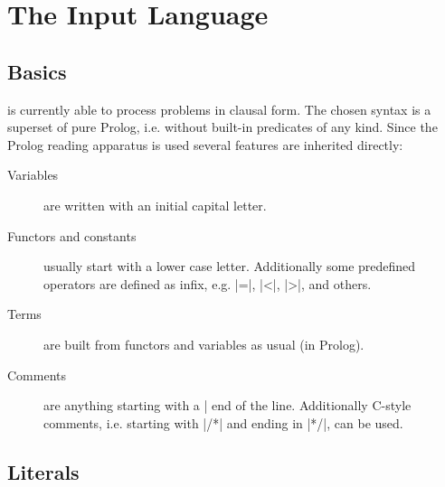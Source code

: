 
\def\SYNTAX#1.{\begin{itemize}\item[]\(#1\) \end{itemize}}

\section{The Input Language}

\subsection{Basics}

\ProCom{} is  currently able to process problems  in  clausal form. The chosen
syntax is a superset of pure  Prolog, i.e. without  built-in predicates of any
kind.  Since  the  Prolog  reading  apparatus  is  used  several features  are
inherited directly:
\begin{description}
  \item [Variables] are written with an initial capital letter.

  \item [Functors  and constants] usually start
    with  a lower  case letter.  Additionally  some  predefined  operators are
    defined as infix, e.g. |=|, |<|, |>|, and others.

  \item [Terms] are built from functors and variables as usual (in
    Prolog).

  \item [Comments] are anything starting with a |%
    end  of the line.  Additionally  C-style comments, i.e. starting with |/*|
    and ending in |*/|, can be used.
\end{description}


\subsection{Literals}

